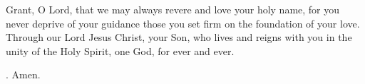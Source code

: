 \lettrine[lines=3]{G}{}rant, O Lord,
that we may always revere and love your holy name,
for you never deprive of your guidance
those you set firm on the foundation of your love.
Through our Lord Jesus Christ, your Son,
who lives and reigns with you in the unity of the Holy Spirit,
one God, for ever and ever. \par \Rbar. Amen.
